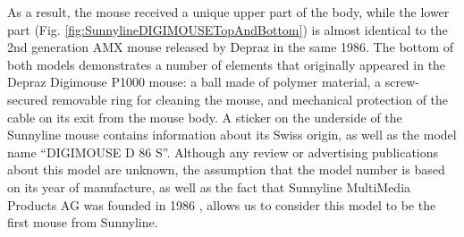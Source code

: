 \documentclass[11pt, a4paper]{article}
\begin{document}
As a result, the mouse received a unique upper part of the body, while the lower part (Fig. \ref{fig:SunnylineDIGIMOUSETopAndBottom}) is almost identical to the 2nd generation AMX mouse released by Depraz in the same 1986.
The bottom of both models demonstrates a number of elements that originally appeared in the Depraz Digimouse P1000 mouse: a ball made of polymer material, a screw-secured removable ring for cleaning the mouse, and mechanical protection of the cable on its exit from the mouse body. A sticker on the underside of the Sunnyline mouse contains information about its Swiss origin, as well as the model name ``DIGIMOUSE D 86 S''. Although any review or advertising publications about this model are unknown, the assumption that the model number is based on its year of manufacture, as well as the fact that Sunnyline MultiMedia Products AG was founded in 1986 \cite{Sunnyline}, allows us to consider this model to be the first mouse from Sunnyline.
\end{document}
